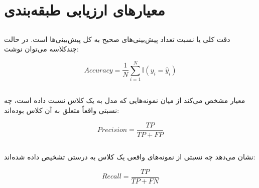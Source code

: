 \section{معیارهای ارزیابی طبقه‌بندی}


\subsection{}

دقت کلی یا
نسبت تعداد پیش‌بینی‌های صحیح به کل پیش‌بینی‌ها است. در حالت چندکلاسه می‌توان نوشت:

\begin{equation}
Accuracy
=
\frac{1}{N}
\sum_{i=1}^{N}
\mathbb{I}(y_i=\hat{y}_i)
\end{equation}


\subsection{}

معیار
مشخص می‌کند از میان نمونه‌هایی که مدل به یک کلاس نسبت داده است، چه نسبتی واقعاً متعلق به آن کلاس بوده‌اند:

\begin{equation}
Precision
=
\frac{TP}{TP+FP}
\end{equation}


\subsection{}

نشان می‌دهد چه نسبتی از نمونه‌های واقعی یک کلاس به درستی تشخیص داده شده‌اند:

\begin{equation}
Recall
=
\frac{TP}{TP+FN}
\end{equation}


\subsection{}

